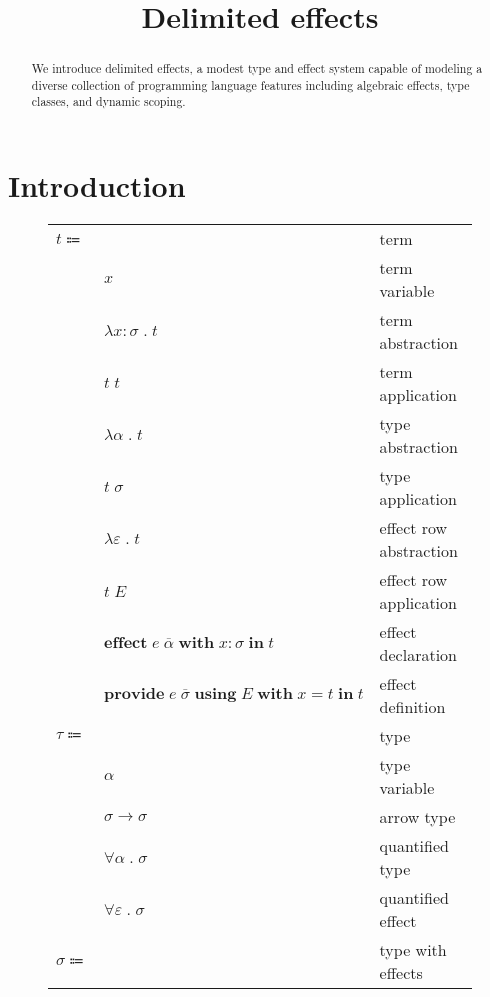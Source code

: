 \documentclass[12pt]{article}
\title{Delimited effects}
\date{}
\newcommand\lstof[1]{\overline{#1}}
\newcommand\eterm{t}
\newcommand\evar{x}
\newcommand\eabs[2]{\lambda #1 \; . \; #2} %
\newcommand\eapp[2]{#1 \; #2}
\newcommand\etabs[2]{\lambda #1 \; . \; #2} %
\newcommand\exabs[2]{\lambda #1 \; . \; #2} %
\newcommand\etapp[2]{#1 \; #2}
\newcommand\exapp[2]{#1 \; #2}
\newcommand\eeffect[4]{\textbf{effect} \; #1 \; \textbf{with} \; \tanno{#2}{#3} \; \textbf{in} \; #4}
\newcommand\eprovide[5]{\textbf{provide} \; #1 \; \textbf{using} \; #2 \; \textbf{with} \; #3 = #4 \; \textbf{in} \; #5}
\newcommand\ttype{\tau}
\newcommand\tvar{\alpha}
\newcommand\tarrow[2]{#1 \rightarrow #2} %
\newcommand\ttforall[2]{\forall #1 \; . \; #2} %
\newcommand\txforall[2]{\forall #1 \; . \; #2} %
\newcommand\tx{\sigma}
\newcommand\tanno[2]{#1 : #2} %
\newcommand\xeffects{E}
\newcommand\xvar{\varepsilon}
\newcommand\xtapp[2]{#1 \; \lstof{#2}}
\newcommand\xeffect{e}
\begin{document}
  \maketitle

  \begin{abstract}
    We introduce delimited effects, a modest type and effect system capable of modeling a diverse collection of programming language features including algebraic effects, type classes, and dynamic scoping.
  \end{abstract}

  \section{Introduction}

  \begin{figure}
    \begin{mdframed}[backgroundcolor=none]
      \begin{center}
        \begin{tabular}{l l l}
          $\eterm \Coloneqq $ & & term \\
          & $\evar$ & term variable \\
          & $\eabs{\tanno{\evar}{\tx}}{\eterm}$ & term abstraction \\
          & $\eapp{\eterm}{\eterm}$ & term application \\
          & $\etabs{\tvar}{\eterm}$ & type abstraction \\
          & $\etapp{\eterm}{\tx}$ & type application \\
          & $\exabs{\xvar}{\eterm}$ & effect row abstraction \\
          & $\exapp{\eterm}{\xeffects}$ & effect row application \\
          & $\eeffect{\xtapp{\xeffect}{\tvar}}{\evar}{\tx}{\eterm}$ & effect declaration \\
          & $\eprovide{\xtapp{\xeffect}{\tx}}{\xeffects}{\evar}{\eterm}{\eterm}$ & effect definition \\
          $\ttype \Coloneqq$ & & type \\
          & $\tvar$ & type variable \\
          & $\tarrow{\tx}{\tx}$ & arrow type \\
          & $\ttforall{\tvar}{\tx}$ & quantified type \\
          & $\txforall{\xvar}{\tx}$ & quantified effect \\
          $\tx \Coloneqq$ & & type with effects \\

\end{tabular}
\end{center}
\end{mdframed}
\end{figure}
\end{document}
